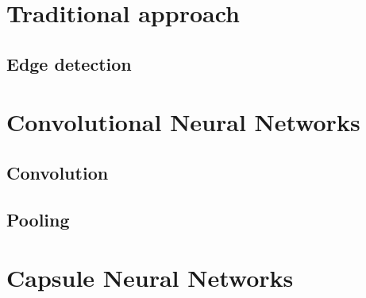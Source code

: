 \section{Traditional approach}

\subsection{Edge detection}

\section{Convolutional Neural Networks}

\subsection{Convolution}

\subsection{Pooling}

\section{Capsule Neural Networks}

